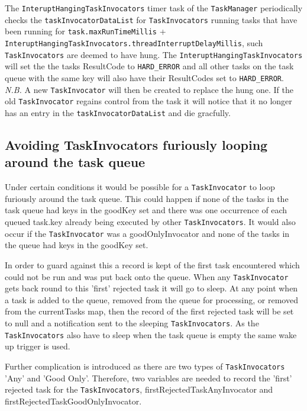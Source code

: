 \begin{sloppypar}
The \texttt{InteruptHangingTaskInvocators} timer task of the \texttt{TaskManager}
periodically checks the \texttt{taskInvocatorDataList} for
\texttt{TaskInvocators} running tasks that have been running for
\texttt{task.maxRunTimeMillis} +
\texttt{InteruptHangingTaskInvocators.threadInterruptDelayMillis}, such
\texttt{TaskInvocators} are deemed to have hung. The
\texttt{InteruptHangingTaskInvocators} will set the the tasks ResultCode to
\texttt{HARD\_ERROR} and all other tasks on the task queue with the same key will
also have their ResultCodes set to \texttt{HARD\_ERROR}. \emph{N.B.}  A new
\texttt{TaskInvocator} will then be created to replace the hung one. If the old
\texttt{TaskInvocator} regains control from the task it will notice that it no
longer has an entry in the \texttt{taskInvocatorDataList} and die gracfully.
\end{sloppypar}

\subsection{Avoiding TaskInvocators furiously looping around the task queue}
Under certain conditions it would be possible for a \texttt{TaskInvocator} to 
loop furiously around the task queue. This could happen if none of the tasks in 
the task queue had keys in the goodKey set and there was one occurrence of each 
queued task.key already being executed by other \texttt{TaskInvocators}. It 
would also occur if the \texttt{TaskInvocator} was a goodOnlyInvocator and none 
of the tasks in the queue had keys in the goodKey set.

In order to guard against this a record is kept of the first task encountered 
which could not be run and was put back onto the queue. When any 
\texttt{TaskInvocator} gets back round to this 'first' rejected task it will go 
to sleep. At any point when a task is added to the queue, removed from the 
queue for processing, or removed from the currentTasks map, then the record of 
the first rejected task will be set to null and a notification sent to the 
sleeping \texttt{TaskInvocators}. As the \texttt{TaskInvocators} also have to 
sleep when the task queue is empty the same wake up trigger is used.

Further complication is introduced as there are two types of 
\texttt{TaskInvocators} 'Any' and 'Good Only'. Therefore, two variables are 
needed to record the 'first' rejected task for the \texttt{TaskInvocators}, 
firstRejectedTaskAnyInvocator and firstRejectedTaskGoodOnlyInvocator.
